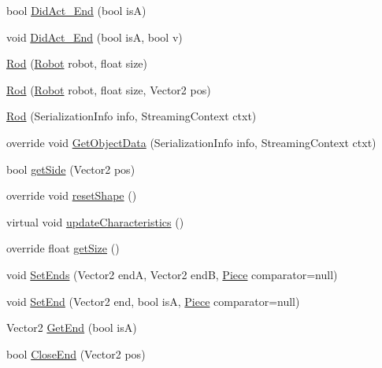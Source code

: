 \begin{DoxyCompactItemize}
\item 
bool \hyperlink{classgearit_1_1src_1_1robot_1_1_rod_a0358d66da5cf9d4fa380d2ea336baad3}{Did\+Act\+\_\+\+End} (bool is\+A)
\item 
void \hyperlink{classgearit_1_1src_1_1robot_1_1_rod_af8c8d1059a5c66c2c47bba128adddfed}{Did\+Act\+\_\+\+End} (bool is\+A, bool v)
\item 
\hyperlink{classgearit_1_1src_1_1robot_1_1_rod_a670535a0c2e627522f771051dcb15179}{Rod} (\hyperlink{classgearit_1_1src_1_1robot_1_1_robot}{Robot} robot, float size)
\item 
\hyperlink{classgearit_1_1src_1_1robot_1_1_rod_a7692945c15925cb9adbe384be4a0b2a6}{Rod} (\hyperlink{classgearit_1_1src_1_1robot_1_1_robot}{Robot} robot, float size, Vector2 pos)
\item 
\hyperlink{classgearit_1_1src_1_1robot_1_1_rod_a39d72807f81c6fd7d34bbd06e350efd8}{Rod} (Serialization\+Info info, Streaming\+Context ctxt)
\item 
override void \hyperlink{classgearit_1_1src_1_1robot_1_1_rod_aeaf2dd011a484e591bd8d977fe62ac52}{Get\+Object\+Data} (Serialization\+Info info, Streaming\+Context ctxt)
\item 
bool \hyperlink{classgearit_1_1src_1_1robot_1_1_rod_aae7868bc7247dde099ac6884ca3b2390}{get\+Side} (Vector2 pos)
\item 
override void \hyperlink{classgearit_1_1src_1_1robot_1_1_rod_aecff9e164fdba30916c6afa5db2e6a4f}{reset\+Shape} ()
\item 
virtual void \hyperlink{classgearit_1_1src_1_1robot_1_1_rod_ae3c886a97641a5c5911153a1848c8647}{update\+Characteristics} ()
\item 
override float \hyperlink{classgearit_1_1src_1_1robot_1_1_rod_acafc38899bd84e8b2316bc9be3210fe0}{get\+Size} ()
\item 
void \hyperlink{classgearit_1_1src_1_1robot_1_1_rod_a409211d61fd237be234a7420f02079d0}{Set\+Ends} (Vector2 end\+A, Vector2 end\+B, \hyperlink{classgearit_1_1src_1_1robot_1_1_piece}{Piece} comparator=null)
\item 
void \hyperlink{classgearit_1_1src_1_1robot_1_1_rod_a7931a737fedf8f454aca2d1451afd704}{Set\+End} (Vector2 end, bool is\+A, \hyperlink{classgearit_1_1src_1_1robot_1_1_piece}{Piece} comparator=null)
\item 
Vector2 \hyperlink{classgearit_1_1src_1_1robot_1_1_rod_a02fddfcc9ffb37adb6301cce36f8b011}{Get\+End} (bool is\+A)
\item 
bool \hyperlink{classgearit_1_1src_1_1robot_1_1_rod_a6dc674fc54f4ee65fcb3a1c557704fa6}{Close\+End} (Vector2 pos)

\end{DoxyCompactItemize}
